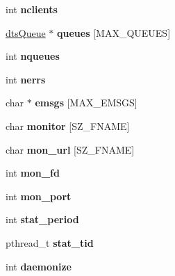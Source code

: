 \begin{CompactItemize}
\item 
\hypertarget{structDTS_38bc416501e8fed9744975cfc760887d}{
int \textbf{nclients}}
\label{structDTS_38bc416501e8fed9744975cfc760887d}

\item 
\hypertarget{structDTS_392bf80fcc5ca9325d7f7e2ae2766b63}{
\hyperlink{structdtsQueue}{dtsQueue} $\ast$ \textbf{queues} \mbox{[}MAX\_\-QUEUES\mbox{]}}
\label{structDTS_392bf80fcc5ca9325d7f7e2ae2766b63}

\item 
\hypertarget{structDTS_8ff6ecc061d1c38b2001a304e8fda4cc}{
int \textbf{nqueues}}
\label{structDTS_8ff6ecc061d1c38b2001a304e8fda4cc}

\item 
\hypertarget{structDTS_5233bef9446dc09a230f60cc4f8823d1}{
int \textbf{nerrs}}
\label{structDTS_5233bef9446dc09a230f60cc4f8823d1}

\item 
\hypertarget{structDTS_52f0809e57c70dcc8c486bdbf78ee801}{
char $\ast$ \textbf{emsgs} \mbox{[}MAX\_\-EMSGS\mbox{]}}
\label{structDTS_52f0809e57c70dcc8c486bdbf78ee801}

\item 
\hypertarget{structDTS_12a49c2f37122e49d659ae8aef04c740}{
char \textbf{monitor} \mbox{[}SZ\_\-FNAME\mbox{]}}
\label{structDTS_12a49c2f37122e49d659ae8aef04c740}

\item 
\hypertarget{structDTS_6f1266b8224b398e02972e859f33b6f9}{
char \textbf{mon\_\-url} \mbox{[}SZ\_\-FNAME\mbox{]}}
\label{structDTS_6f1266b8224b398e02972e859f33b6f9}

\item 
\hypertarget{structDTS_d1a6fc391d132688f5235df324bb36d6}{
int \textbf{mon\_\-fd}}
\label{structDTS_d1a6fc391d132688f5235df324bb36d6}

\item 
\hypertarget{structDTS_85930395299091cdb396187062adb54d}{
int \textbf{mon\_\-port}}
\label{structDTS_85930395299091cdb396187062adb54d}

\item 
\hypertarget{structDTS_79e944eb3af2c155453878c28af298b5}{
int \textbf{stat\_\-period}}
\label{structDTS_79e944eb3af2c155453878c28af298b5}

\item 
\hypertarget{structDTS_8b0ba3b5238a5d7a554e23427920e8de}{
pthread\_\-t \textbf{stat\_\-tid}}
\label{structDTS_8b0ba3b5238a5d7a554e23427920e8de}

\item 
\hypertarget{structDTS_06df1641982721a7c6081c2132ee649f}{
int \textbf{daemonize}}
\label{structDTS_06df1641982721a7c6081c2132ee649f}


\end{CompactItemize}
